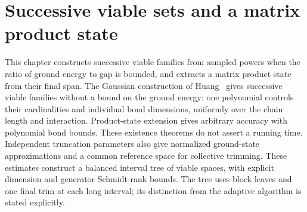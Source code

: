\chapter{Successive viable sets and a matrix product state}
\label{ch:gapped_chain_construction}

This chapter constructs successive viable families from sampled powers
when the ratio of ground energy to gap is bounded, and extracts a matrix
product state from their final span. The Gaussian construction of
Huang~\cite[Section~5.4]{Huang2015GroundState} gives successive viable
families without a bound on the ground energy: one polynomial controls
their cardinalities and individual bond dimensions, uniformly over the
chain length and interaction. Product-state extension gives arbitrary
accuracy with polynomial bond bounds. These existence theorems do not
assert a running time. Independent truncation parameters also give normalized
ground-state approximations and a common reference space for collective
trimming. These estimates construct a balanced interval tree of viable
spaces, with explicit dimension and generator Schmidt-rank bounds. The
tree uses block leaves and one final trim at each long interval; its
distinction from the adaptive algorithm is stated explicitly.





















